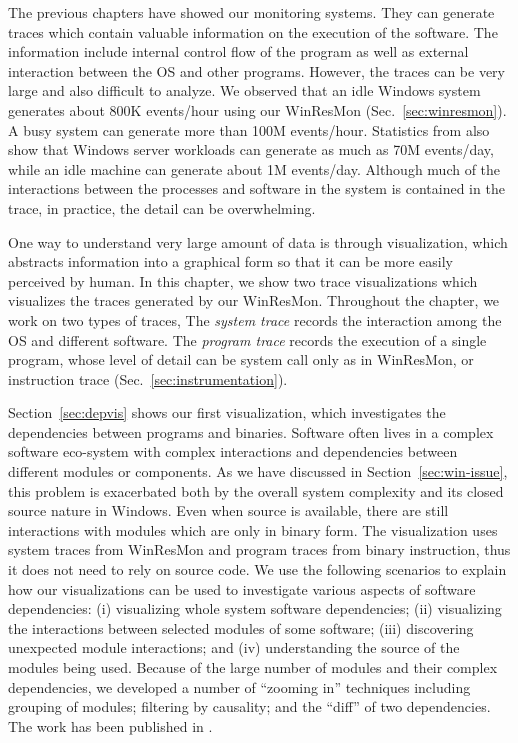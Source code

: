
The previous chapters have showed our monitoring systems.
They can generate traces which contain valuable information on
the execution of the software.
The information include internal control flow of the program as well
as external interaction between the OS and other programs.
However, the traces can be very large and also difficult to analyze.
We observed that an idle Windows system generates about 800K
events/hour using our WinResMon (Sec.~\ref{sec:winresmon}).
A busy system can generate more than 100M events/hour.
Statistics from \cite{verbowski6flight} also show that Windows
server workloads can generate as much as 70M events/day,
while an idle machine can generate about 1M events/day.
Although much of the interactions between the processes and software in the
system is contained in the trace, in practice, the detail
can be overwhelming.

One way to understand very large amount of data is through visualization,
which abstracts information into a graphical form so that it can be more
easily perceived by human.
In this chapter, we show two trace visualizations which visualizes
the traces generated by our WinResMon.
Throughout the chapter,
we work on two types of traces,
The {\em system trace} records the interaction among the OS and
different software.
The {\em program trace} records the execution of a single program,
whose level of detail can be system call only as in WinResMon, or
instruction trace (Sec.~\ref{sec:instrumentation}).

Section~\ref{sec:depvis} shows our first visualization, which
investigates the dependencies between programs and binaries.
Software often lives in a complex software eco-system
with complex interactions and dependencies between different
modules or components.
As we have discussed in Section~\ref{sec:win-issue},
this problem is exacerbated both by the 
overall system complexity and its closed source nature in Windows.
Even when source is available, there are still interactions with
modules which are only in binary form.
The visualization uses system traces from WinResMon and
program traces from binary instruction,
thus it does not need to rely on source code.
We use the following scenarios to explain how our visualizations can
be used to investigate various aspects of software dependencies:
(i) visualizing whole system software dependencies;
(ii) visualizing the interactions between selected modules of some software;
(iii) discovering unexpected module interactions; 
and (iv) understanding the source of the modules being used.
Because of the large number of modules and their complex dependencies,
we developed a number of ``zooming in'' techniques including
grouping of modules;
filtering by causality; and
the ``diff'' of two dependencies.
The work has been published in \cite{wu2010comprehending}.


